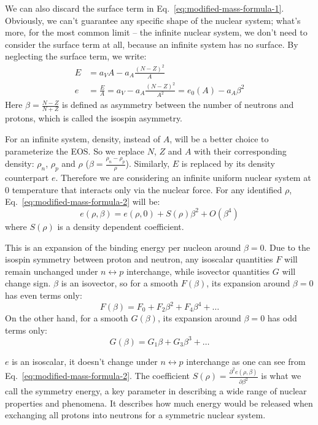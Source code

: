 We can also discard the surface term in Eq.~\ref{eq:modified-mass-formula-1}. 
Obviously, we can't guarantee
any specific shape of the nuclear system; what's more, for the most common limit
-- the infinite nuclear system, we don't need to consider the surface 
term at all, because an infinite system has no surface. By neglecting the surface
term, we write:
\begin{equation}
    \begin{aligned}
	E &= a_V A - a_A\frac{(N-Z)^2}{A}  \\
	e &= \frac{E}{A} = a_V - a_A\frac{(N-Z)^2}{A^2} = e_0(A) - a_A\beta^2 
    \end{aligned}
    \label{eq:modified-mass-formula-2}
\end{equation}
Here $\beta = \frac{N-Z}{N+Z}$ is defined as asymmetry between the number of neutrons and protons,
which is called the isospin asymmetry.

For an infinite system, density, instead of $A$, will be a better choice to parameterize
the EOS. So we replace $N$, $Z$ and $A$ with their corresponding density: $\rho_n$, 
$\rho_p$ and $\rho$ ($\beta = \frac{\rho_n - \rho_p}{\rho}$). Similarly, $E$ is replaced by
its density counterpart $e$.
Therefore we are considering an infinite uniform nuclear system at 0 temperature that interacts
only via the nuclear force. For any identified $\rho$,
Eq.~\ref{eq:modified-mass-formula-2} will be:
\begin{equation}
    e(\rho, \beta) = e(\rho, 0) + S(\rho)\beta^2 + O(\beta^4)
    \label{eq:symmetry-energy}
\end{equation}
where $S(\rho)$ is a density dependent coefficient.

This is an expansion of the binding energy per nucleon around $\beta = 0$.
Due to the isospin symmetry between proton and neutron, any isoscalar quantities
$F$ will remain unchanged under $n \leftrightarrow p$ interchange, while isovector 
quantities $G$ will change sign. $\beta$ is an isovector, so for a smooth $F(\beta)$,
its expansion around $\beta = 0$ has even terms only:
$$ F(\beta) = F_0 + F_2\beta^2 + F_4\beta^4 + \dots $$
On the other hand, for a smooth $G(\beta)$, its expansion around $\beta = 0$ has
odd terms only:
$$ G(\beta) = G_1\beta + G_3\beta^3 + \dots $$

$e$ is an isoscalar, it doesn't change under $n \leftrightarrow p$ interchange 
as one can see from Eq.~\ref{eq:modified-mass-formula-2}. The coefficient 
$S(\rho) = \frac{\partial^2 e (\rho, \beta)}{\partial \beta^2}$ is
what we call the symmetry energy, a key parameter in describing a wide
range of nuclear properties and phenomena. It describes how much energy would be
released when exchanging all protons into neutrons for a symmetric nuclear system. 

